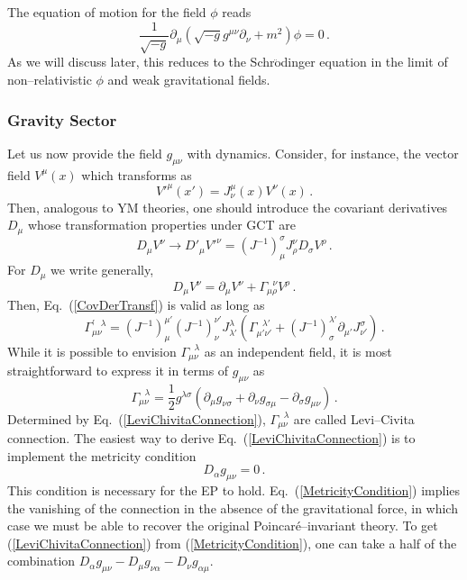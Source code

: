 \documentclass[11pt,a4paper]{article}
\begin{document}
The equation of motion for the field $\phi$ reads
\begin{equation}
\dfrac{1}{\sqrt{-g}}\partial_\mu(\sqrt{-g}g^{\mu\nu}\partial_\nu+m^2)\phi=0 \,.
\end{equation}
As we will discuss later, this reduces to the Schr$\ddot{\text{o}}$dinger equation in the limit of non--relativistic $\phi$ and weak gravitational fields.

\subsubsection{Gravity Sector}

Let us now provide the field $g_{\mu\nu}$ with dynamics. Consider, for instance, the vector field $V^\mu(x)$ which transforms as
\begin{equation}
V'^\mu(x')=J^\mu_\nu(x)V^\nu(x) \,.
\end{equation}
Then, analogous to YM theories, one should introduce the covariant derivatives $D_\mu$ whose transformation properties under GCT are
\begin{equation}\label{CovDerTransf}
D_\mu V^\nu\rightarrow D'_\mu V'^\nu=(J^{-1})^\sigma_\mu J^\nu_\rho D_\sigma V^\rho \,.
\end{equation}
For $D_\mu$ we write generally,
\begin{equation}\label{CovDerVector}
D_\mu V^\nu=\partial_\mu V^\nu+\Gamma^{~~~\nu}_{\mu\rho}V^\rho \,.
\end{equation}
Then, Eq.~(\ref{CovDerTransf}) is valid as long as
\begin{equation}
\Gamma_{\mu\nu}^{'~~~\lambda}=(J^{-1})^{\mu'}_\mu (J^{-1})^{\nu'}_\nu J^\lambda_{\lambda'}\left(\Gamma_{\mu'\nu'}^{~~~\lambda'}+(J^{-1})^{\lambda'}_\sigma\partial_{\mu'}J^\sigma_{\nu'}\right) \,.
\end{equation}
While it is possible to envision $\Gamma_{\mu\nu}^{~~~\lambda}$ as an independent field, it is most straightforward to
express it in terms of $g_{\mu\nu}$ as
\begin{equation}\label{LeviChivitaConnection}
\Gamma_{\mu\nu}^{~~~\lambda}=\dfrac{1}{2}g^{\lambda\sigma}(\partial_\mu g_{\nu\sigma}+\partial_\nu g_{\sigma\mu}-\partial_\sigma g_{\mu\nu}) \,.
\end{equation}
Determined by Eq.~(\ref{LeviChivitaConnection}), $\Gamma_{\mu\nu}^{~~~\lambda}$ are called Levi--Civita connection. The easiest way to derive Eq.~(\ref{LeviChivitaConnection}) is to implement the metricity condition
\begin{equation}\label{MetricityCondition}
D_{\alpha}g_{\mu\nu}=0 \,.
\end{equation}
This condition is necessary for the EP to hold. Eq.~(\ref{MetricityCondition}) implies the vanishing of the connection in the absence of the gravitational force, in which case we must be able to recover the original Poincar\'e--invariant theory. To get (\ref{LeviChivitaConnection}) from (\ref{MetricityCondition}), one can take a half of the combination $D_{\alpha}g_{\mu\nu}-D_{\mu}g_{\nu\alpha}-D_{\nu}g_{\alpha\mu}$.
\end{document}
